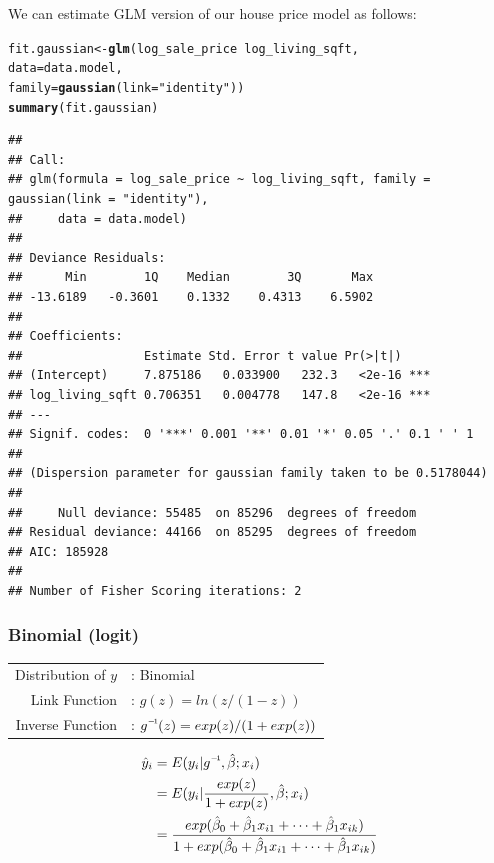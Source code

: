 \documentclass[10pt]{article}\usepackage[]{graphicx}\usepackage[]{color}
\makeatletter
\newcommand{\hlstr}[1]{\textcolor[rgb]{0.192,0.494,0.8}{#1}}%
\newcommand{\hlopt}[1]{\textcolor[rgb]{0,0,0}{#1}}%
\newcommand{\hlstd}[1]{\textcolor[rgb]{0.345,0.345,0.345}{#1}}%
\newcommand{\hlkwb}[1]{\textcolor[rgb]{0.69,0.353,0.396}{#1}}%
\newcommand{\hlkwc}[1]{\textcolor[rgb]{0.333,0.667,0.333}{#1}}%
\newcommand{\hlkwd}[1]{\textcolor[rgb]{0.737,0.353,0.396}{\textbf{#1}}}%
\newenvironment{kframe}{%
 \def\at@end@of@kframe{}%
 \ifinner\ifhmode%
  \def\at@end@of@kframe{\end{minipage}}%
  \begin{minipage}{\columnwidth}%
 \fi\fi%
 \def\FrameCommand##1{\hskip\@totalleftmargin \hskip-\fboxsep
 \colorbox{shadecolor}{##1}\hskip-\fboxsep
     \hskip-\linewidth \hskip-\@totalleftmargin \hskip\columnwidth}%
 \MakeFramed {\advance\hsize-\width
   \@totalleftmargin\z@ \linewidth\hsize
   \@setminipage}}%
 {\par\unskip\endMakeFramed%
 \at@end@of@kframe}
\newenvironment{knitrout}{}{} %
\newcommand\inv[1]{#1\raisebox{1.15ex}{$\scriptscriptstyle-\!1$}}
\makeatother
\begin{document}
We can estimate GLM version of our house price model as follows:

\begin{knitrout}\small
{}\color{fgcolor}\begin{kframe}
\begin{alltt}
\hlstd{fit.gaussian}\hlkwb{<-}\hlkwd{glm}\hlstd{(log_sale_price} \hlopt{~} \hlstd{log_living_sqft,}
                  \hlkwc{data}\hlstd{=data.model,}
                  \hlkwc{family}\hlstd{=}\hlkwd{gaussian}\hlstd{(}\hlkwc{link}\hlstd{=}\hlstr{"identity"}\hlstd{))}
\hlkwd{summary}\hlstd{(fit.gaussian)}
\end{alltt}
\begin{verbatim}
## 
## Call:
## glm(formula = log_sale_price ~ log_living_sqft, family = gaussian(link = "identity"), 
##     data = data.model)
## 
## Deviance Residuals: 
##      Min        1Q    Median        3Q       Max  
## -13.6189   -0.3601    0.1332    0.4313    6.5902  
## 
## Coefficients:
##                 Estimate Std. Error t value Pr(>|t|)    
## (Intercept)     7.875186   0.033900   232.3   <2e-16 ***
## log_living_sqft 0.706351   0.004778   147.8   <2e-16 ***
## ---
## Signif. codes:  0 '***' 0.001 '**' 0.01 '*' 0.05 '.' 0.1 ' ' 1
## 
## (Dispersion parameter for gaussian family taken to be 0.5178044)
## 
##     Null deviance: 55485  on 85296  degrees of freedom
## Residual deviance: 44166  on 85295  degrees of freedom
## AIC: 185928
## 
## Number of Fisher Scoring iterations: 2
\end{verbatim}
\end{kframe}
\end{knitrout}


\subsubsection*{Binomial (logit)}

\begin{tabularx}{\textwidth}{r@{}l@{}}
  { Distribution of $y$ } &: Binomial \\
  { Link Function } &: $g(z)=ln( z / (1-z))$ \\
  { Inverse Function } &: $\inv{g}(z)= exp(z) / (1+exp(z)) $ \\
\end{tabularx}

\begin{align}
  \hat{y}_i &= E(y_i|\inv{g},\hat{\beta};x_i) \\
  &= E(y_i| \frac{exp(z)}{1+exp(z)},\hat{\beta};x_i) \\
  &= \frac{exp(\hat{\beta}_0 + \hat{\beta}_1 x_{i1} + \cdots + \hat{\beta}_1 x_{ik})}{1+exp(\hat{\beta}_0 + \hat{\beta}_1 x_{i1} + \cdots + \hat{\beta}_1 x_{ik})}
\end{align}
\end{document}
